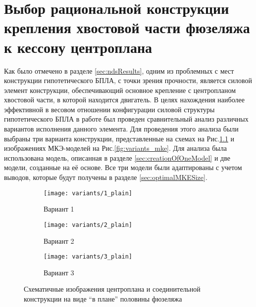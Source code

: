  
\chapter{Выбор рациональной конструкции крепления хвостовой части фюзеляжа к кессону центроплана}
Как было отмечено в разделе \ref{sec:ndsResults}, одним из проблемных с мест конструкции гипотетического БПЛА, с точки зрения прочности, является силовой элемент конструкции, обеспечивающий основное крепление с центропланом хвостовой части, в которой находится двигатель. В целях нахождения наиболее эффективной в весовом отношении конфигурации силовой структуры гипотетического БПЛА в работе был проведен сравнительный анализ различных вариантов исполнения данного элемента. Для проведения этого анализа были выбраны три варианта конструкции, представленные на схемах на Рис.\ref{fig:variants_plain} и изображениях МКЭ-моделей на Рис.\ref{fig:variants_mke}. Для анализа была использована модель, описанная в разделе \ref{sec:creationOfOneModel} и две модели, созданные на её основе. Все три модели были адаптированы с учетом выводов, которые будут получены в разделе \ref{sec:optimalMKESize}.  

\begin{figure}[H]
\centering
\captionsetup{justification=centering}
\begin{subfigure}[b]{0.32\textwidth}
\centering
	\texttt{[image: variants/1\_plain]}
	\caption{Вариант 1}
\end{subfigure}
\hspace{\fill}
\begin{subfigure}[b]{0.32\textwidth}
\centering
	\texttt{[image: variants/2\_plain]}
	\caption{Вариант 2}
\end{subfigure}
\hspace{\fill}
\begin{subfigure}[b]{0.32\textwidth}
\centering
	\texttt{[image: variants/3\_plain]}
	\caption{Вариант 3}
\end{subfigure}
\hspace{\fill}
\caption{Схематичные изображения центроплана и соединительной конструкции на виде ``в плане'' половины фюзеляжа }
\label{fig:variants_plain}
\end{figure}	


